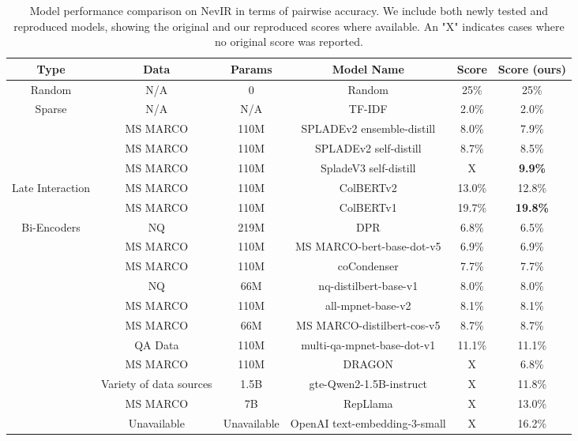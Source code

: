\begin{table*}[tbp]
  \caption{Model performance comparison on NevIR in terms of pairwise accuracy. We include both newly tested and reproduced models, showing the original and our reproduced scores where available. An "X" indicates cases where no original score was reported.}
  \label{tab:model_comparison}
  \begin{tabular}{cccccc}
    \toprule
    Type & Data & Params & Model Name & Score & Score (ours) \\
    \midrule
    Random & N/A & 0 & Random & 25\% & 25\%\\
    \midrule
    Sparse & N/A & N/A & TF-IDF & 2.0\% & 2.0\% \\
    & MS MARCO & 110M & SPLADEv2 ensemble-distill \cite{formal2022distillation} & 8.0\% & 7.9\%\\
    & MS MARCO & 110M & SPLADEv2 self-distill \cite{formal2022distillation} & 8.7\% & 8.5\% \\
    & MS MARCO & 110M & SpladeV3 self-distill \cite{spladev3} & X & \textbf{9.9\%} \\
    \midrule
    Late Interaction & MS MARCO & 110M & ColBERTv2 \cite{santhanam2021colbertv2} & 13.0\% & 12.8\% \\
    & MS MARCO & 110M & ColBERTv1 \cite{colbertv1}& 19.7\% & \textbf{19.8\%}\\
    \midrule
    Bi-Encoders & NQ & 219M & DPR \cite{dpr} & 6.8\% & 6.5\%\\
    & MS MARCO & 110M & MS MARCO-bert-base-dot-v5 & 6.9\% & 6.9\%\\
    & MS MARCO & 110M & coCondenser \cite{gao-callan-2022-unsupervised} & 7.7\% & 7.7\%\\
    & NQ & 66M & nq-distilbert-base-v1 & 8.0\% & 8.0\%\\
    & MS MARCO & 110M & all-mpnet-base-v2 & 8.1\% & 8.1\%\\
    & MS MARCO & 66M & MS MARCO-distilbert-cos-v5 & 8.7\% & 8.7\%\\
    & QA Data & 110M & multi-qa-mpnet-base-dot-v1 & 11.1\% & 11.1\%\\
    & MS MARCO & 110M & DRAGON \cite{dragon} & X & 6.8\% \\
    & Variety of data sources \cite{qwen_gte}  & 1.5B & gte-Qwen2-1.5B-instruct \cite{qwen_gte} & X & 11.8\% \\
    & MS MARCO & 7B & RepLlama \cite{repllama_rankllama} & X & 13.0\%  \\
    & Unavailable & Unavailable & OpenAI text-embedding-3-small & X & 16.2\% \\

\end{tabular}
\end{table*}
